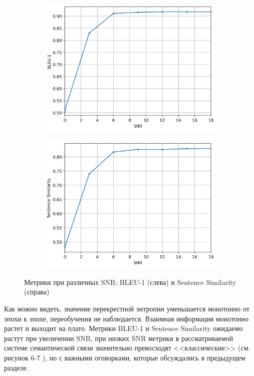 \documentclass[a4paper,12pt]{article}
\begin{document}
	\begin{figure}[h!]
		\centering
		\begin{subfigure}{0.35\linewidth}
			\includegraphics[width=\linewidth]{figures/bleu}
		\end{subfigure}
		\begin{subfigure}{0.35\linewidth}
			\includegraphics[width=\linewidth]{figures/sim}
		\end{subfigure}
		\caption{Метрики при различных SNR: BLEU-1 (слева) и Sentence Similarity (справа)}
	\end{figure}
	
	
	Как можно видеть, значение перекрестной энтропии уменьшается монотонно от эпохи к эпохе, переобучения не наблюдается. Взаимная информация монотонно растет и выходит на плато. Метрики BLEU-1 и Sentence Similarity ожидаемо растут при увеличении SNR, при низких SNR метрики в рассматриваемой системе семантической связи значительно превосходят <<классические>> (см. рисунок 6-7 \cite{xie2021sem}), но с важными оговорками, которые обсуждались в предыдущем разделе.
	
\end{document}
